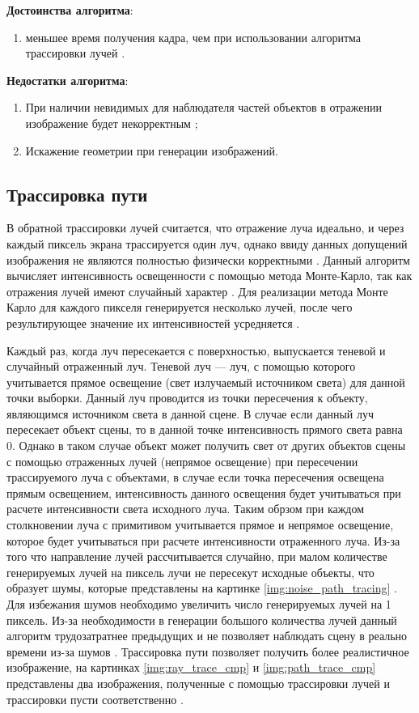 \textbf{Достоинства алгоритма}:
\begin{enumerate}
	\item меньшее время получения кадра, чем при использовании алгоритма трассировки лучей \cite{SSR}.
\end{enumerate}

\textbf{Недостатки алгоритма}:
\begin{enumerate}
	\item При наличии невидимых для наблюдателя частей объектов в отражении изображение будет некорректным \cite{SSR};
	\item Искажение геометрии при генерации изображений. \cite{SSR}
\end{enumerate}

\subsection{Трассировка пути}
В обратной трассировки лучей считается, что отражение луча идеально,  и через каждый пиксель экрана трассируется один луч, однако ввиду данных допущений
изображения не являются полностью физически корректными \cite{ray_path_tracing}.
Данный алгоритм вычисляет интенсивность освещенности с помощью метода Монте-Карло, так как отражения лучей имеют случайный характер \cite{monte_carlo}.
Для реализации метода Монте Карло  для каждого пикселя генерируется несколько  лучей,
после чего результирующее значение их интенсивностей усредняется \cite{path_tracing_def}.

Каждый раз, когда луч пересекается с поверхностью, выпускается теневой и случайный отраженный луч.
Теневой луч --- луч, с помощью которого учитывается прямое освещение (свет излучаемый источником света) для данной точки выборки. Данный луч проводится из 
точки пересечения к объекту, являющимся источником света в данной сцене. В случае если данный луч пересекает объект сцены, то в данной точке интенсивность
прямого света равна 0. Однако в таком случае объект может получить свет от других объектов сцены с помощью отраженных лучей (непрямое освещение) при пересечении трассируемого луча
с объектами, в случае если  точка пересечения освещена прямым освещением, интенсивность данного освещения будет учитываться при расчете интенсивности света исходного луча.
Таким обрзом при каждом столкновении луча с примитивом учитывается прямое и непрямое освещение, которое будет учитываться при расчете интенсивности отраженного луча.
Из-за того что направление лучей рассчитывается случайно, при малом количестве генерируемых лучей на пиксель лучи не пересекут исходные объекты, что образует шумы, которые 
представлены на картинке \ref{img:noise_path_tracing} \cite{path_tracing, ray_path_tracing}. Для избежания шумов необходимо увеличить число генерируемых лучей на 1 пиксель.
Из-за необходимости в генерации большого количества лучей данный алгоритм трудозатратнее предыдущих и не позволяет наблюдать сцену в реально времени из-за шумов \cite{path_tracing}.
Трассировка пути позволяет получить более реалистичное изображение, на картинках \ref{img:ray_trace_cmp} и \ref{img:path_trace_cmp} представлены два изображения,
полученные с помощью трассировки лучей и трассировки пусти соответственно \cite{cyber_trce}.





